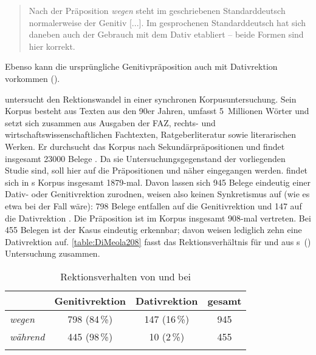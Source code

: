 \begin{quote}
Nach der Pr{\"a}position \textit{wegen }steht im geschriebenen Standarddeutsch normalerweise der Genitiv [...].\textit{ }Im gesprochenen Standarddeutsch hat sich daneben auch der Gebrauch mit dem Dativ etabliert -- beide Formen sind hier korrekt.~\citep[1020--1021]{Duden2016b}
\end{quote}
Ebenso kann die ursprüngliche Genitivpräposition auch mit Dativrektion vorkommen (\cites[s.][1008]{Duden2016b}[{\S}1450]{Duden2022}). 

\citet[]{DiMeola2000} untersucht den Rektionswandel in einer synchronen Korpusuntersuchung. 
Sein Korpus besteht aus Texten aus den 90er Jahren, umfasst 5~Millionen Wörter und setzt sich zusammen aus Ausgaben der FAZ, rechts- und wirtschaftswissenschaftlichen Fachtexten, Ratgeberliteratur sowie literarischen Werken. 
Er durchsucht das Korpus nach Sekundärpräpositionen und findet insgesamt 23000 Belege \citep[s.][2]{DiMeola2000}.  
Da sie Untersuchungsgegenstand der vorliegenden Studie sind, soll hier auf die Präpositionen \wegen{} und \waehrend{} näher eingegangen werden. 
 findet sich in \citeauthor{DiMeola2000}s Korpus insgesamt 1879-mal. 
Davon lassen sich 945 Belege eindeutig einer Dativ- oder Genitivrektion zurodnen, weisen also keinen Synkretismus auf (wie es etwa bei  der Fall wäre): 
798 Belege entfallen auf die Genitivrektion und 147 auf die Dativrektion \citep[s.][208]{DiMeola2000}. 
Die Präposition  ist im Korpus insgesamt 908-mal vertreten. Bei 455 Belegen ist der Kasus eindeutig erkennbar; davon weisen lediglich zehn eine Dativrektion auf. \autoref{table:DiMeola208} fasst das Rektionsverhältnis für  und  aus \citeauthor{DiMeola2000}s~(\citeyear{DiMeola2000}) Untersuchung zusammen.
\begin{table}
\centering
\begin{tabular}{llll}
\lsptoprule
      & Genitivrektion                 & Dativrektion                   & gesamt                  \\
      \midrule
\textit{wegen}   & \multicolumn{1}{c}{798 (84\,\%)} & \multicolumn{1}{c}{147 (16\,\%)} & \multicolumn{1}{c}{945} \\
\textit{während} & \multicolumn{1}{c}{445 (98\,\%)} & \multicolumn{1}{c}{10 (2\,\%)}   & \multicolumn{1}{c}{455} \\
\lspbottomrule
\end{tabular}
\caption{Rektionsverhalten von  und  bei \citet[208]{DiMeola2000}}
\label{table:DiMeola208}
\end{table}

